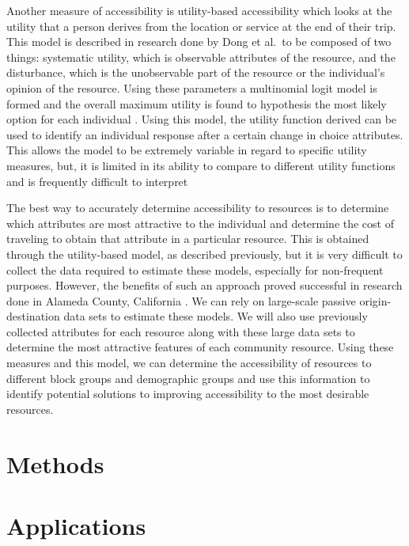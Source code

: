 \documentclass[3p, authoryear]{elsarticle} %
\begin{document}
Another measure of accessibility is utility-based accessibility which looks at
the utility that a person derives from the location or service at the end of
their trip. This model is described in research done by Dong et al.~to be
composed of two things: systematic utility, which is observable attributes of
the resource, and the disturbance, which is the unobservable part of the
resource or the individual's opinion of the resource. Using these parameters a
multinomial logit model is formed and the overall maximum utility is found to
hypothesis the most likely option for each individual \citep{dong2006moving}. Using
this model, the utility function derived can be used to identify an individual
response after a certain change in choice attributes. This allows the model to
be extremely variable in regard to specific utility measures, but, it is limited
in its ability to compare to different utility functions and is frequently
difficult to interpret \citep{handy1997measuring}

The best way to accurately determine accessibility to resources is to determine
which attributes are most attractive to the individual and determine the cost of
traveling to obtain that attribute in a particular resource. This is obtained
through the utility-based model, as described previously, but it is very
difficult to collect the data required to estimate these models, especially for
non-frequent purposes. However, the benefits of such an approach proved
successful in research done in Alameda County, California \citep{macfarlane2020modeling}. We can rely on large-scale passive origin-destination data sets to
estimate these models. We will also use previously collected attributes for each
resource along with these large data sets to determine the most attractive
features of each community resource. Using these measures and this model, we can
determine the accessibility of resources to different block groups and
demographic groups and use this information to identify potential solutions to
improving accessibility to the most desirable resources.

\hypertarget{methods}{%
\section{Methods}\label{methods}}

\hypertarget{applications}{%
\section{Applications}\label{applications}}
\end{document}
